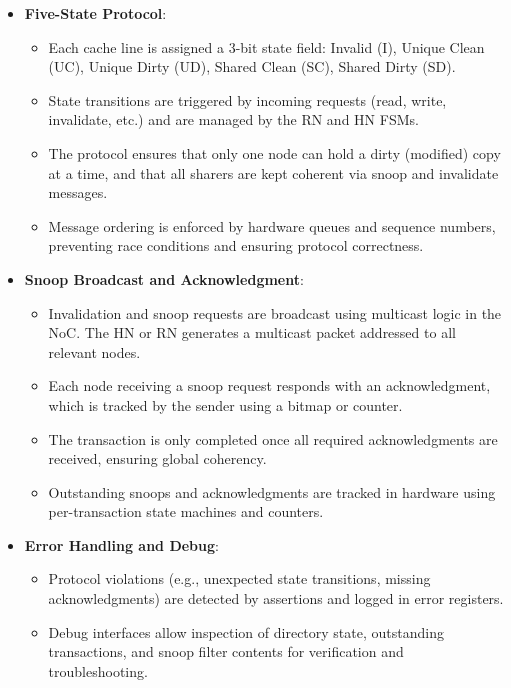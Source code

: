 \documentclass[11pt,a4paper]{article}
\begin{document}
\begin{itemize}
\begin{itemize}
    \end{itemize}
    \item \textbf{Five-State Protocol}:
    \begin{itemize}
        \item Each cache line is assigned a 3-bit state field: Invalid (I), Unique Clean (UC), Unique Dirty (UD), Shared Clean (SC), Shared Dirty (SD).
        \item State transitions are triggered by incoming requests (read, write, invalidate, etc.) and are managed by the RN and HN FSMs.
        \item The protocol ensures that only one node can hold a dirty (modified) copy at a time, and that all sharers are kept coherent via snoop and invalidate messages.
        \item Message ordering is enforced by hardware queues and sequence numbers, preventing race conditions and ensuring protocol correctness.
    \end{itemize}
    \item \textbf{Snoop Broadcast and Acknowledgment}:
    \begin{itemize}
        \item Invalidation and snoop requests are broadcast using multicast logic in the NoC. The HN or RN generates a multicast packet addressed to all relevant nodes.
        \item Each node receiving a snoop request responds with an acknowledgment, which is tracked by the sender using a bitmap or counter.
        \item The transaction is only completed once all required acknowledgments are received, ensuring global coherency.
        \item Outstanding snoops and acknowledgments are tracked in hardware using per-transaction state machines and counters.
    \end{itemize}
    \item \textbf{Error Handling and Debug}:
    \begin{itemize}
        \item Protocol violations (e.g., unexpected state transitions, missing acknowledgments) are detected by assertions and logged in error registers.
        \item Debug interfaces allow inspection of directory state, outstanding transactions, and snoop filter contents for verification and troubleshooting.
    \end{itemize}
\end{itemize}
\end{document}
